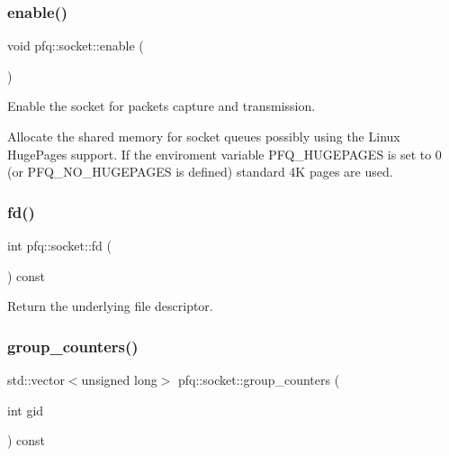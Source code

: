 \subsubsection{\texorpdfstring{enable()}{enable()}}
{\footnotesize\ttfamily void pfq\+::socket\+::enable (\begin{DoxyParamCaption}{ }\end{DoxyParamCaption})\hspace{0.3cm}{\ttfamily [inline]}}



Enable the socket for packets capture and transmission. 

Allocate the shared memory for socket queues possibly using the Linux Huge\+Pages support. If the enviroment variable P\+F\+Q\+\_\+\+H\+U\+G\+E\+P\+A\+G\+ES is set to 0 (or P\+F\+Q\+\_\+\+N\+O\+\_\+\+H\+U\+G\+E\+P\+A\+G\+ES is defined) standard 4K pages are used. \mbox{\label{classpfq_1_1socket_a159189ab268469b3a6c438747a5bbb8c}} 
\subsubsection{\texorpdfstring{fd()}{fd()}}
{\footnotesize\ttfamily int pfq\+::socket\+::fd (\begin{DoxyParamCaption}{ }\end{DoxyParamCaption}) const\hspace{0.3cm}{\ttfamily [inline]}}



Return the underlying file descriptor. 

\mbox{\label{classpfq_1_1socket_ac1548d51e8727a57fe6e98953769bf80}} 
\subsubsection{\texorpdfstring{group\+\_\+counters()}{group\_counters()}}
{\footnotesize\ttfamily std\+::vector$<$unsigned long$>$ pfq\+::socket\+::group\+\_\+counters (\begin{DoxyParamCaption}\item[{int}]{gid }\end{DoxyParamCaption}) const\hspace{0.3cm}{\ttfamily [inline]}}




